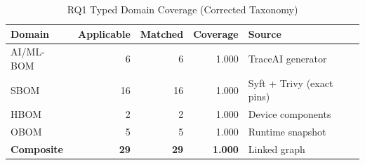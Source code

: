 \begin{table}[htbp]
\caption{RQ1 Typed Domain Coverage (Corrected Taxonomy)}
\label{tab:rq1-final}
\centering\small
\begin{tabular}{lrrrl}
\toprule
\textbf{Domain} & \textbf{Applicable} & \textbf{Matched} & \textbf{Coverage} & \textbf{Source} \\
\midrule
  AI/ML-BOM & 6 & 6 & 1.000 & TraceAI generator \\
  SBOM & 16 & 16 & 1.000 & Syft + Trivy (exact pins) \\
  HBOM & 2 & 2 & 1.000 & Device components \\
  OBOM & 5 & 5 & 1.000 & Runtime snapshot \\
\midrule
  \textbf{Composite} & \textbf{29} & \textbf{29} & \textbf{1.000} & Linked graph \\
\bottomrule
\end{tabular}
\end{table}